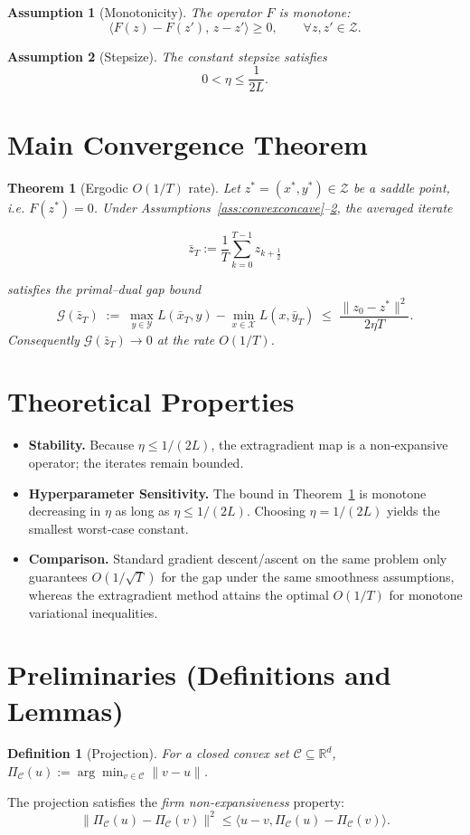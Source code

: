 \documentclass{article}
\newtheorem{theorem}{Theorem}
\newtheorem{assumption}{Assumption}
\newtheorem{definition}{Definition}
\begin{document}
\begin{assumption}[Monotonicity]\label{ass:mono}
The operator $F$ is monotone:
\[
\langle F(z)-F(z'),\,z-z'\rangle\ge 0,\qquad\forall z,z'\in\mathcal Z .
\]
\end{assumption}

\begin{assumption}[Stepsize]\label{ass:stepsize}
The constant stepsize satisfies 
\[
0<\eta\le\frac{1}{2L}.
\]
\end{assumption}

\section*{Main Convergence Theorem}
\begin{theorem}[Ergodic $O(1/T)$ rate]\label{thm:rate}
Let $z^{*}=(x^{*},y^{*})\in\mathcal Z$ be a saddle point, i.e. $F(z^{*})=0$.  
Under Assumptions~\ref{ass:convexconcave}–\ref{ass:stepsize}, the averaged iterate  

\[
\bar z_{T}:=\frac{1}{T}\sum_{k=0}^{T-1}z_{k+\frac12}
\]

satisfies the \emph{primal–dual gap bound}
\[
\mathcal G(\bar z_{T})\;:=\;
\max_{y\in\mathcal Y}L(\bar x_{T},y)-\min_{x\in\mathcal X}L(x,\bar y_{T})
\;\le\;
\frac{\|z_{0}-z^{*}\|^{2}}{2\eta T}.
\]
Consequently $\mathcal G(\bar z_{T})\to0$ at the rate $O(1/T)$.
\end{theorem}

\section*{Theoretical Properties}
\begin{itemize}
\item \textbf{Stability.} Because $\eta\le 1/(2L)$, the extragradient map is a non‑expansive operator; the iterates remain bounded.
\item \textbf{Hyperparameter Sensitivity.} The bound in Theorem~\ref{thm:rate} is monotone decreasing in $\eta$ as long as $\eta\le 1/(2L)$. Choosing $\eta=1/(2L)$ yields the smallest worst‑case constant.
\item \textbf{Comparison.} Standard gradient descent/ascent on the same problem only guarantees $O(1/\sqrt{T})$ for the gap under the same smoothness assumptions, whereas the extragradient method attains the optimal $O(1/T)$ for monotone variational inequalities.
\end{itemize}

\section*{Preliminaries (Definitions and Lemmas)}
\begin{definition}[Projection]
For a closed convex set $\mathcal C\subseteq\mathbb R^{d}$, $\Pi_{\mathcal C}(u):=\arg\min_{v\in\mathcal C}\|v-u\|$.
\end{definition}
The projection satisfies the \emph{firm non‑expansiveness} property:
\[
\|\Pi_{\mathcal C}(u)-\Pi_{\mathcal C}(v)\|^{2}\le\langle u-v,\Pi_{\mathcal C}(u)-\Pi_{\mathcal C}(v)\rangle .
\tag{P}
\]
\end{document}
